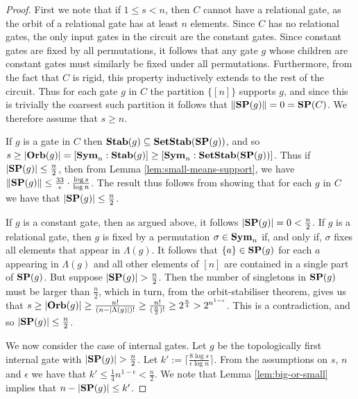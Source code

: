 \documentclass[../paper.tex]{subfiles}
\begin{document}
\begin{proof}
  First we note that if $1 \leq s < n$, then $C$ cannot have a relational gate,
  as the orbit of a relational gate has at least $n$ elements. Since $C$ has no
  relational gates, the only input gates in the circuit are the constant gates.
  Since constant gates are fixed by all permutations, it follows that any gate
  $g$ whose children are constant gates must similarly be fixed under all
  permutations. Furthermore, from the fact that $C$ is rigid, this property
  inductively extends to the rest of the circuit. Thus for each gate $g$ in $C$
  the partition $\{[n]\}$ supports $g$, and since this is trivially the coarsest
  such partition it follows that $\| \text{\textbf{SP}}(g) \| = 0 = \text{\textbf{SP}}(C)$. We therefore
  assume that $s \geq n$.

  If $g$ is a gate in $C$ then $\text{\textbf{Stab}} (g) \subseteq \text{\textbf{SetStab}}(\text{\textbf{SP}}(g))$, and so $s
  \geq \vert \text{\textbf{Orb}}(g) \vert = [\text{\textbf{Sym}}_n : \text{\textbf{Stab}}(g)] \geq [\text{\textbf{Sym}}_n :
  \text{\textbf{SetStab}}(\text{\textbf{SP}}(g))]$. Thus if $\vert \text{\textbf{SP}}(g) \vert \leq \frac{n}{2}$, then from
  Lemma \ref{lem:small-means-support}, we have $\| \text{\textbf{SP}} (g) \| \leq
  \frac{33}{\epsilon} \cdot \frac{\log s} {\log n}$. The result thus follows
  from showing that for each $g$ in $C$ we have that $\vert \text{\textbf{SP}} (g) \vert \leq
  \frac{n}{2}$.
  
  If $g$ is a constant gate, then as argued above, it follows $\vert \text{\textbf{SP}}(g)
  \vert = 0 < \frac{n}{2}$. If $g$ is a relational gate, then $g$ is fixed by a
  permutation $\sigma \in \text{\textbf{Sym}}_n$ if, and only if, $\sigma$ fixes all elements
  that appear in $\Lambda(g)$. It follows that $\{a\} \in \text{\textbf{SP}}(g)$ for each $a$
  appearing in $\Lambda(g)$ and all other elements of $[n]$ are contained in a
  single part of $\text{\textbf{SP}}(g)$. But suppose $\vert \text{\textbf{SP}}(g) \vert > \frac{n}{2}$. Then
  the number of singletons in $\text{\textbf{SP}}(g)$ must be larger than $\frac{n}{2}$, which
  in turn, from the orbit-stabiliser theorem, gives us that $ s \geq \vert \text{\textbf{Orb}}
  (g) \vert \geq \frac{n!}{(n-\vert \Lambda (g) \vert)!} \geq
  \frac{n!}{{(\frac{n}{2}})!} \geq 2^{\frac{n}{4}} > 2^{n^{1- \epsilon}} $. This
  is a contradiction, and so $\vert \text{\textbf{SP}}(g) \vert \leq \frac{n}{2}$.

  We now consider the case of internal gates. Let $g$ be the topologically first
  internal gate with $\vert \text{\textbf{SP}}(g) \vert > \frac{n}{2}$. Let $k' := \lceil
  \frac{8 \log s}{\epsilon \log n} \rceil$. From the assumptions on $s$, $ n$
  and $\epsilon$ we have that $k' \leq \frac{1}{4}n^{1-\epsilon} < \frac{n}{2}$.
  We note that Lemma \ref{lem:big-or-small} implies that $n - \vert \text{\textbf{SP}}(g) \vert
  \leq k'$.
  

\end{proof}
\end{document}
